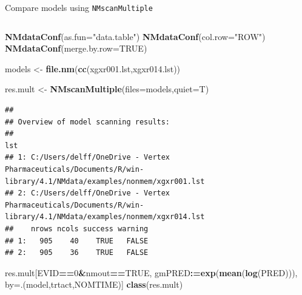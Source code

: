 \documentclass[
  8pt,
  ignorenonframetext,
  aspectratio=169]{beamer}
\newenvironment{Shaded}{\begin{snugshade}}{\end{snugshade}}
\newcommand{\DataTypeTok}[1]{\textcolor[rgb]{0.13,0.29,0.53}{#1}}
\newcommand{\DecValTok}[1]{\textcolor[rgb]{0.00,0.00,0.81}{#1}}
\newcommand{\ErrorTok}[1]{\textcolor[rgb]{0.64,0.00,0.00}{\textbf{#1}}}
\newcommand{\KeywordTok}[1]{\textcolor[rgb]{0.13,0.29,0.53}{\textbf{#1}}}
\newcommand{\NormalTok}[1]{#1}
\newcommand{\OperatorTok}[1]{\textcolor[rgb]{0.81,0.36,0.00}{\textbf{#1}}}
\newcommand{\OtherTok}[1]{\textcolor[rgb]{0.56,0.35,0.01}{#1}}
\newcommand{\StringTok}[1]{\textcolor[rgb]{0.31,0.60,0.02}{#1}}
\begin{document}
\begin{frame}[fragile]{Compare models using \texttt{NMscanMultiple}}
\protect\hypertarget{compare-models-using-nmscanmultiple}{}
\begin{columns}[T]
\begin{column}{0.45\textwidth}
\footnotesize

\begin{Shaded}
\begin{Highlighting}[]
\KeywordTok{NMdataConf}\NormalTok{(}\DataTypeTok{as.fun=}\StringTok{"data.table"}\NormalTok{)}
\KeywordTok{NMdataConf}\NormalTok{(}\DataTypeTok{col.row=}\StringTok{"ROW"}\NormalTok{)}
\KeywordTok{NMdataConf}\NormalTok{(}\DataTypeTok{merge.by.row=}\OtherTok{TRUE}\NormalTok{)}
\end{Highlighting}
\end{Shaded}

\begin{Shaded}
\begin{Highlighting}[]
\NormalTok{models \textless{}{-}}\StringTok{ }\KeywordTok{file.nm}\NormalTok{(}\KeywordTok{cc}\NormalTok{(xgxr001.lst,xgxr014.lst))}

\NormalTok{res.mult \textless{}{-}}\StringTok{ }\KeywordTok{NMscanMultiple}\NormalTok{(}\DataTypeTok{files=}\NormalTok{models,}\DataTypeTok{quiet=}\NormalTok{T)}
\end{Highlighting}
\end{Shaded}

\begin{verbatim}
## 
## Overview of model scanning results:
##                                                                                                                lst
## 1: C:/Users/delff/OneDrive - Vertex Pharmaceuticals/Documents/R/win-library/4.1/NMdata/examples/nonmem/xgxr001.lst
## 2: C:/Users/delff/OneDrive - Vertex Pharmaceuticals/Documents/R/win-library/4.1/NMdata/examples/nonmem/xgxr014.lst
##    nrows ncols success warning
## 1:   905    40    TRUE   FALSE
## 2:   905    36    TRUE   FALSE
\end{verbatim}

\begin{Shaded}
\begin{Highlighting}[]
\NormalTok{res.mult[EVID}\OperatorTok{==}\DecValTok{0}\OperatorTok{\&}\NormalTok{nmout}\OperatorTok{==}\OtherTok{TRUE}\NormalTok{,}
\NormalTok{         gmPRED}\OperatorTok{:}\ErrorTok{=}\KeywordTok{exp}\NormalTok{(}\KeywordTok{mean}\NormalTok{(}\KeywordTok{log}\NormalTok{(PRED))),}
\NormalTok{         by=.(model,trtact,NOMTIME)]}
\KeywordTok{class}\NormalTok{(res.mult)}
\end{Highlighting}
\end{Shaded}


\end{column}
\end{columns}
\end{frame}
\end{document}

